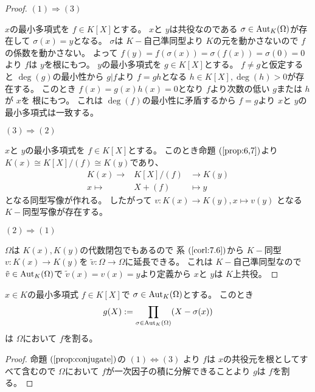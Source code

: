 \documentclass[../master_galois_theory]{subfiles}
\begin{document}
\begin{proof}
  $(1) \Rightarrow (3)$

  $x$の最小多項式を $f \in K[X]$とする。
  $x$と $y$は共役なのである $\sigma \in \mathrm{Aut}_K(\Omega)$が存在して
  $\sigma(x) = y$となる。
  $\sigma$は $K-$自己準同型より $K$の元を動かさないので $f$の係数を動かさない。
  よって $f(y) = f(\sigma(x)) = \sigma(f(x)) = \sigma(0) = 0$より
  $f$は $y$を根にもつ。
  $y$の最小多項式を $g \in K[X]$とする。
  $f \neq g$と仮定すると $\deg(g)$の最小性から $g|f$より
  $f = gh$となる $h \in K[X] , \deg(h) > 0$が存在する。
  このとき $f(x) = g(x)h(x) = 0$となり $f$より次数の低い $g$または $h$が $x$を
  根にもつ。
  これは $\deg(f)$の最小性に矛盾するから $f = g$より $x$と $y$の最小多項式は一致する。

  $(3) \Rightarrow (2)$

  $x$と $y$の最小多項式を $f \in K[X]$とする。
  このとき命題 $(\mathrm{\ref{prop:6,7}})$より
  $K(x) \cong K[X]/(f) \cong K(y)$であり、
  \begin{eqnarray*}
    K(x) \longrightarrow & K[X]/(f) & \longrightarrow K(y) \\
    x \longmapsto & X + (f) & \longmapsto y
  \end{eqnarray*}
  となる同型写像が作れる。
  したがって $v : K(x) \longrightarrow K(y) , x \longmapsto v(y)$
  となる $K-$同型写像が存在する。

  $(2) \Rightarrow (1)$

  $\Omega$は $K(x) , K(y)$の代数閉包でもあるので
  系 $(\mathrm{\ref{corl:7.6}})$から $K-$同型 $v : K(x) \longrightarrow K(y)$を
  $\tilde{v} : \Omega \longrightarrow \Omega$に延長できる。
  これは $K-$自己準同型なので $\tilde{v} \in \mathrm{Aut}_K(\Omega)$で
  $\tilde{v}(x) = v(x) = y$より定義から $x$と $y$は $K$上共役。
\end{proof}

\begin{corl}
  $x \in K$の最小多項式 $f \in K[X]$で $\sigma \in \mathrm{Aut}_K(\Omega)$とする。
  このとき
  \begin{eqnarray*}
    g(X) := \prod_{\sigma \in \mathrm{Aut}_K(\Omega)} (X - \sigma(x))
  \end{eqnarray*}
  は $\Omega$において $f$を割る。
  \end{corl}

\begin{proof}
  命題 $(\mathrm{\ref{prop:conjugate}})$の $(1) \Leftrightarrow (3)$
  より $f$は $x$の共役元を根としてすべて含むので $\Omega$において
  $f$が一次因子の積に分解できることより $g$は $f$を割る。
\end{proof}
\end{document}
